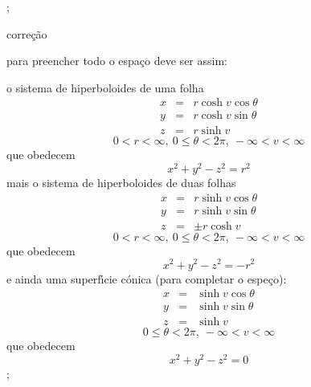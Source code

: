\documentclass[a4paper,12pt]{article}
\begin{document}
;

corre\c{c}\~{a}o

para preencher todo o espa\c{c}o deve ser assim:

o sistema de hiperboloides de uma folha%
\begin{eqnarray*}
x &=&r\cosh v\cos \theta  \\
y &=&r\cosh v\sin \theta  \\
z &=&r\sinh v
\end{eqnarray*}%
\begin{equation*}
0<r<\infty ,\ 0\leq \theta <2\pi ,\ -\infty <v<\infty 
\end{equation*}%
que obedecem%
\begin{equation*}
x^{2}+y^{2}-z^{2}=r^{2}
\end{equation*}%
mais o sistema de hiperboloides de duas folhas%
\begin{eqnarray*}
x &=&r\sinh v\cos \theta  \\
y &=&r\sinh v\sin \theta  \\
z &=&\pm r\cosh v
\end{eqnarray*}%
\begin{equation*}
0<r<\infty ,\ 0\leq \theta <2\pi ,\ -\infty <v<\infty 
\end{equation*}%
que obedecem%
\begin{equation*}
x^{2}+y^{2}-z^{2}=-r^{2}
\end{equation*}%
e ainda uma superf\'{\i}cie c\'{o}nica (para completar o espe\c{c}o):%
\begin{eqnarray*}
x &=&\sinh v\cos \theta  \\
y &=&\sinh v\sin \theta  \\
z &=&\sinh v
\end{eqnarray*}%
\begin{equation*}
0\leq \theta <2\pi ,\ -\infty <v<\infty 
\end{equation*}%
que obedecem%
\begin{equation*}
x^{2}+y^{2}-z^{2}=0
\end{equation*}%
\begin{equation*}
\end{equation*}%
;
\end{document}
